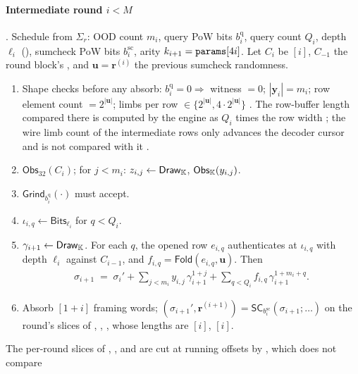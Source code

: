 \paragraph{Intermediate round $i<M$} 
. Schedule from $\Sigma_r$: OOD count $m_i$,
query PoW bits $b^{\mathrm q}_i$, query count $Q_i$, depth $\ell_i$
(), sumcheck PoW bits $b^{\mathrm{sc}}_i$, arity
$k_{i+1} = \texttt{params}[4i]$. Let $C_i$ be $[i]$,
$C_{-1}$ the round block's , and $\mathbf{u} =
\mathbf{r}^{(i)}$ the previous sumcheck randomness.
\begin{enumerate}
\item Shape checks before any absorb: $b^{\mathrm q}_i = 0 \Rightarrow$ witness
  $=0$; $|\mathbf{y}_i| = m_i$; row element count $=2^{|\mathbf{u}|}$; limbs per
  row $\in\{2^{|\mathbf u|}, 4\cdot 2^{|\mathbf u|}\}$
  . The row-buffer length compared there is
  computed by the engine as $Q_i$ times the row width
  ; the wire limb count of the intermediate rows
  only advances the decoder cursor and is not compared with it
  .
\item $\mathsf{Obs}_{32}(C_i)$; for $j<m_i$: $z_{i,j} \gets \mathsf{Draw}_{\mathbb{K}}$,
  $\mathsf{Obs}_{\mathbb{K}}(y_{i,j})$.
\item $\mathsf{Grind}_{b^{\mathrm q}_i}(\cdot)$ must accept.
\item $\iota_{i,q} \gets \mathsf{Bits}_{\ell_i}$ for $q<Q_i$.
\item $\gamma_{i+1} \gets \mathsf{Draw}_{\mathbb{K}}$. For each $q$, the opened row
  $e_{i,q}$ authenticates at $\iota_{i,q}$ with depth $\ell_i$ against
  $C_{i-1}$, and $f_{i,q} = \mathsf{Fold}(e_{i,q}, \mathbf u)$. Then
  \begin{align}
    \sigma_{i+1} \;=\; \sigma_i' + \sum_{j<m_i} y_{i,j}\,\gamma_{i+1}^{1+j}
    + \sum_{q<Q_i} f_{i,q}\,\gamma_{i+1}^{1+m_i+q}.
  \end{align}
\item Absorb $[1+i]$ framing words;
  $(\sigma_{i+1}', \mathbf r^{(i+1)}) = \mathsf{SC}_{b^{\mathrm{sc}}_i}(\sigma_{i+1};
  \ldots)$ on the round's slices of , , , whose
  lengths are $[i]$, $[i]$.
\end{enumerate}
The per-round slices of , ,  and
 are cut at running offsets by , which does not compare
